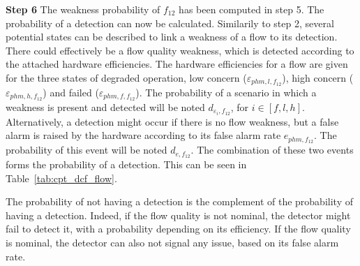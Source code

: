\textbf{Step 6}\hspace{5pt}
The weakness probability of $f_{12}$ has been computed in step 5. The probability of a detection can now be calculated. Similarily to step 2, several potential states can be described to link a weakness of a flow to its detection. There could effectively be a flow quality weakness, which is detected according to the attached hardware efficiencies. The hardware efficiencies for a flow are given for the three states of degraded operation, low concern ($\varepsilon_{phm, l, f_{12}}$), high concern ($\varepsilon_{phm, h, f_{12}}$) and failed ($\varepsilon_{phm, f, f_{12}}$). The probability of a scenario in which a weakness is present and detected will be noted $d_{\varepsilon_i, f_{12}}$, for $i \in [f, l, h]$. Alternatively, a detection might occur if there is no flow weakness, but a false alarm is raised by the hardware according to its false alarm rate $e_{phm, f_{12}}$. The probability of this event will be noted $d_{e, f_{12}}$. The combination of these two events forms the probability of a detection. This can be seen in Table~\ref{tab:cpt_dcf_flow}.

The probability of not having a detection is the complement of the probability of having a detection. Indeed, if the flow quality is not nominal, the detector might fail to detect it, with a probability depending on its efficiency. If the flow quality is nominal, the detector can also not signal any issue, based on its false alarm rate.

